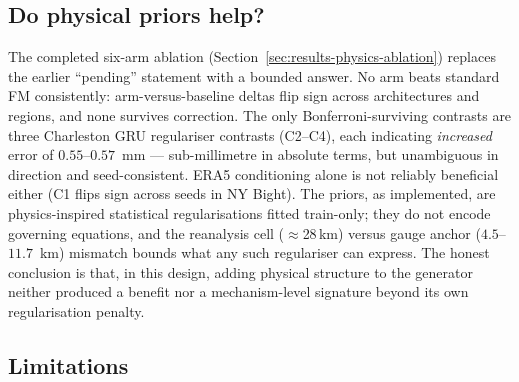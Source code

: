 \subsection{Do physical priors help?}
\label{subsec:why-physics}

The completed six-arm ablation (Section~\ref{sec:results-physics-ablation})
replaces the earlier ``pending'' statement with a bounded answer. No arm
beats standard FM consistently: arm-versus-baseline deltas flip sign across
architectures and regions, and none survives correction. The only
Bonferroni-surviving contrasts are three Charleston GRU regulariser
contrasts (C2--C4), each indicating \emph{increased} error of
$0.55$--$0.57$~mm --- sub-millimetre in absolute terms, but unambiguous in
direction and seed-consistent. ERA5 conditioning alone is not reliably
beneficial either (C1 flips sign across seeds in NY Bight). The priors,
as implemented, are physics-inspired statistical regularisations fitted
train-only; they do not encode governing equations, and the reanalysis cell
($\approx$28\,km) versus gauge anchor ($4.5$--$11.7$~km) mismatch bounds
what any such regulariser can express. The honest conclusion is that, in
this design, adding physical structure to the generator neither produced a
benefit nor a mechanism-level signature beyond its own regularisation
penalty.

\subsection{Limitations}
\label{subsec:limitations}

